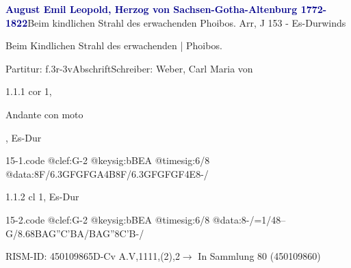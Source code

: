\documentclass[a4paper, twocolumn, 11pt]{book}
\begin{document}
\par \vspace{16pt} \textcolor{darkblue}{\textbf{August Emil Leopold, Herzog von Sachsen-Gotha-Altenburg  1772-1822}}\hfillplus{[15]}\newline Beim kindlichen Strahl des erwachenden Phoibos. Arr, J 153 - Es-Dur\newline winds
\par \begin{itshape} Beim Kindlichen Strahl des erwachenden | Phoibos.\end{itshape} 
\par \textcolor{darkblue}{}  Partitur: f.3r-3v\newline Abschrift\newline Schreiber: Weber, Carl Maria von
\par 1.1.1  cor 1, \begin{itshape}Andante con moto\end{itshape}, Es-Dur  
\begin{filecontents*}{15-1.code}
@clef:G-2
@keysig:bBEA
@timesig:6/8
@data:8F/6.3{GFGFGA}4B8F/{6.3GFGFGF}4E8-/
\end{filecontents*}
\newline %
\par 1.1.2  cl 1, Es-Dur  
\begin{filecontents*}{15-2.code}
@clef:G-2
@keysig:bBEA
@timesig:6/8
@data:8-/=1/48--G/8.68{BAG}{''C'BA}/{BAG}''{8C'B}-/
\end{filecontents*}
\newline %
\par RISM-ID: 450109865\newline D-Cv  A.V,1111,(2),2\newline $\rightarrow$ In Sammlung 80 (450109860)
      
\end{document}
